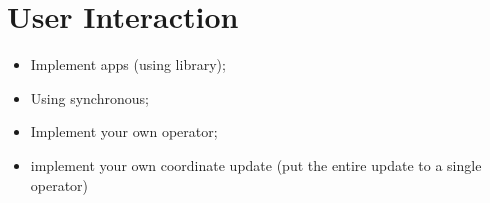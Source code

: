 \section{User Interaction}

\begin{itemize}
\item Implement apps (using library);
\item Using synchronous;
\item Implement your own operator;
\item implement your own coordinate update (put the entire update to a single operator)
\end{itemize}
